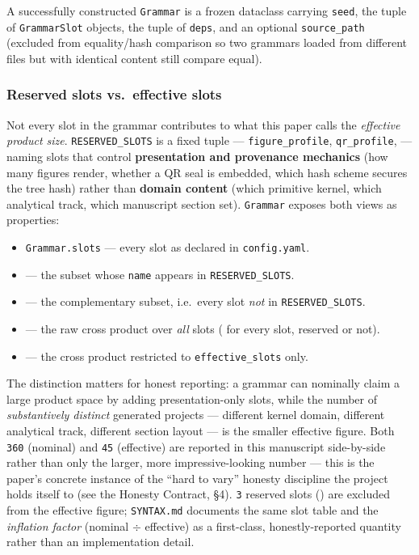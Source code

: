 \documentclass[
]{article}
\providecommand{\tightlist}{%
  \setlength{\itemsep}{0pt}\setlength{\parskip}{0pt}}
\begin{document}
A successfully constructed \texttt{Grammar} is a frozen dataclass
carrying \texttt{seed}, the tuple of \texttt{GrammarSlot} objects, the
tuple of \texttt{deps}, and an optional \texttt{source\_path} (excluded
from equality/hash comparison so two grammars loaded from different
files but with identical content still compare equal).

\subsubsection{Reserved slots vs.~effective
slots}\label{reserved-slots-vs.-effective-slots}

Not every slot in the grammar contributes to what this paper calls the
\emph{effective product size}. \texttt{RESERVED\_SLOTS} is a fixed tuple
--- \texttt{figure\_profile}, \texttt{qr\_profile},
 --- naming slots that control
\textbf{presentation and provenance mechanics} (how many figures render,
whether a QR seal is embedded, which hash scheme secures the tree hash)
rather than \textbf{domain content} (which primitive kernel, which
analytical track, which manuscript section set). \texttt{Grammar}
exposes both views as properties:

\begin{itemize}
\tightlist
\item
  \texttt{Grammar.slots} --- every slot as declared in
  \texttt{config.yaml}.
\item
   --- the subset whose \texttt{name}
  appears in \texttt{RESERVED\_SLOTS}.
\item
   --- the complementary subset,
  i.e.~every slot \emph{not} in \texttt{RESERVED\_SLOTS}.
\item
   --- the raw cross product over
  \emph{all} slots ( for every slot,
  reserved or not).
\item
   --- the cross product
  restricted to \texttt{effective\_slots} only.
\end{itemize}

The distinction matters for honest reporting: a grammar can nominally
claim a large product space by adding presentation-only slots, while the
number of \emph{substantively distinct} generated projects --- different
kernel domain, different analytical track, different section layout ---
is the smaller effective figure. Both \texttt{360} (nominal) and
\texttt{45} (effective) are reported in this manuscript side-by-side
rather than only the larger, more impressive-looking number --- this is
the paper's concrete instance of the ``hard to vary'' honesty discipline
the project holds itself to (see the Honesty Contract, §4). \texttt{3}
reserved slots
() are
excluded from the effective figure; \texttt{SYNTAX.md} documents the
same slot table and the \emph{inflation factor} (nominal \texorpdfstring{\ensuremath{\div}}{/} effective) as
a first-class, honestly-reported quantity rather than an implementation
detail.
\end{document}
